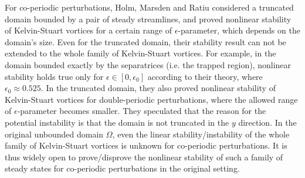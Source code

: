 \documentclass[1 [leqno, 11pt]{amsart}
\numberwithin{equation}{section}
\let\ep=\epsilon
\begin{document}
\begin{CJK*}{GBK}{song}
For co-periodic perturbations,
Holm, Marsden and Ratiu \cite{holm1986nonlinear} considered a truncated domain bounded by a pair of steady streamlines, and proved nonlinear stability of Kelvin-Stuart vortices for a certain range of  $\ep$-parameter, which depends on the domain's size.
Even for the truncated domain, their stability result can not be extended to  the whole family of  Kelvin-Stuart vortices. For example,
in the domain bounded exactly by the separatrices (i.e. the trapped region), nonlinear stability holds true only for $\ep\in[0,\ep_0]$ according to their theory, where $\ep_0\approx0.525$. In the truncated domain, they also
proved nonlinear stability of Kelvin-Stuart vortices for double-periodic perturbations, where the allowed   range of  $\ep$-parameter becomes smaller.
They speculated that the  reason for the potential instability is that the domain is not truncated in the $y$ direction.
In the original unbounded domain $\Omega$, even the linear stability/instability of the whole family of Kelvin-Stuart vortices is unknown for co-periodic perturbations.
It is thus widely open to prove/disprove the nonlinear stability of such a family of steady states for co-periodic perturbations  in the original setting.


\end{CJK*}
\end{document}
